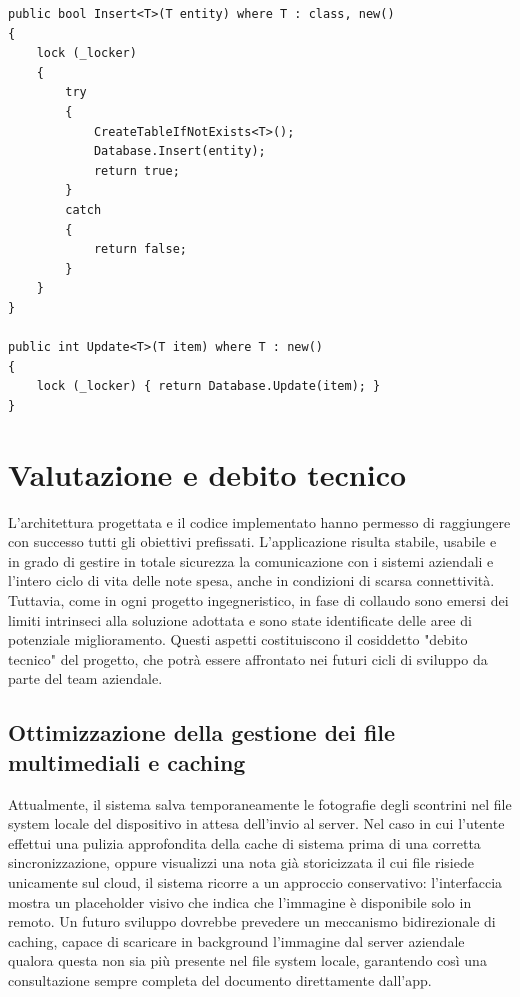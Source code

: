 \begin{listing}[H]
\begin{verbatim}
public bool Insert<T>(T entity) where T : class, new()
{
    lock (_locker)
    {
        try
        {
            CreateTableIfNotExists<T>();
            Database.Insert(entity);
            return true;
        }
        catch
        {
            return false;
        }
    }
}

public int Update<T>(T item) where T : new()
{
    lock (_locker) { return Database.Update(item); }
}
\end{verbatim}
\caption{Esempio di gestione della connessione con il costrutto lock}
\label{listing:b}
\end{listing}


\section{Valutazione e debito tecnico}
\label{sec:valutazione-debito}
\noindent L'architettura progettata e il codice implementato hanno permesso di raggiungere con successo tutti gli obiettivi prefissati. L'applicazione risulta stabile, usabile e in grado di gestire in totale sicurezza la comunicazione con i sistemi aziendali e l'intero ciclo di vita delle note spesa, anche in condizioni di scarsa connettività. Tuttavia, come in ogni progetto ingegneristico, in fase di collaudo sono emersi dei limiti intrinseci alla soluzione adottata e sono state identificate delle aree di potenziale miglioramento. Questi aspetti costituiscono il cosiddetto "debito tecnico" del progetto, che potrà essere affrontato nei futuri cicli di sviluppo da parte del team aziendale.

\subsection*{Ottimizzazione della gestione dei file multimediali e caching}
\noindent Attualmente, il sistema salva temporaneamente le fotografie degli scontrini nel file system locale del dispositivo in attesa dell'invio al server. Nel caso in cui l'utente effettui una pulizia approfondita della cache di sistema prima di una corretta sincronizzazione, oppure visualizzi una nota già storicizzata il cui file risiede unicamente sul cloud, il sistema ricorre a un approccio conservativo: l'interfaccia mostra un placeholder visivo che indica che l'immagine è disponibile solo in remoto. Un futuro sviluppo dovrebbe prevedere un meccanismo bidirezionale di caching, capace di scaricare in background l'immagine dal server aziendale qualora questa non sia più presente nel file system locale, garantendo così una consultazione sempre completa del documento direttamente dall'app.


